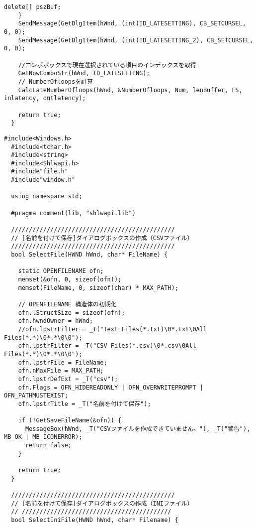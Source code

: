 \begin{lstlisting}[caption=window.cpp]
      delete[] pszBuf;
    }
    SendMessage(GetDlgItem(hWnd, (int)ID_LATESETTING), CB_SETCURSEL, 0, 0);
    SendMessage(GetDlgItem(hWnd, (int)ID_LATESETTING_2), CB_SETCURSEL, 0, 0);

    //コンボボックスで現在選択されている項目のインデックスを取得
    GetNowComboStr(hWnd, ID_LATESETTING);
    // NumberOfloopsを計算
    CalcLateNumberOfloops(hWnd, &NumberOfloops, Num, lenBuffer, FS, inlatency, outlatency);

    return true;
  }

\end{lstlisting}

\begin{lstlisting}[caption=file.cpp]
  #include<Windows.h>
  #include<tchar.h>
  #include<string>
  #include<Shlwapi.h>
  #include"file.h"
  #include"window.h"

  using namespace std;

  #pragma comment(lib, "shlwapi.lib")

  //////////////////////////////////////////////
  // [名前を付けて保存]ダイアログボックスの作成（CSVファイル）
  //////////////////////////////////////////////
  bool SelectFile(HWND hWnd, char* FileName) {

    static OPENFILENAME ofn;
    memset(&ofn, 0, sizeof(ofn));
    memset(FileName, 0, sizeof(char) * MAX_PATH);

    // OPENFILENAME 構造体の初期化
    ofn.lStructSize = sizeof(ofn);
    ofn.hwndOwner = hWnd;
    //ofn.lpstrFilter = _T("Text Files(*.txt)\0*.txt\0All Files(*.*)\0*.*\0\0"); 
    ofn.lpstrFilter = _T("CSV Files(*.csv)\0*.csv\0All Files(*.*)\0*.*\0\0");
    ofn.lpstrFile = FileName;
    ofn.nMaxFile = MAX_PATH;
    ofn.lpstrDefExt = _T("csv");
    ofn.Flags = OFN_HIDEREADONLY | OFN_OVERWRITEPROMPT | OFN_PATHMUSTEXIST;
    ofn.lpstrTitle = _T("名前を付けて保存");

    if (!GetSaveFileName(&ofn)) {
      MessageBox(hWnd, _T("CSVファイルを作成できていません。"), _T("警告"), MB_OK | MB_ICONERROR);
      return false;
    }

    return true;
  }

  //////////////////////////////////////////////
  // [名前を付けて保存]ダイアログボックスの作成（INIファイル）
  // //////////////////////////////////////////
  bool SelectIniFile(HWND hWnd, char* Filename) {


\end{lstlisting}
